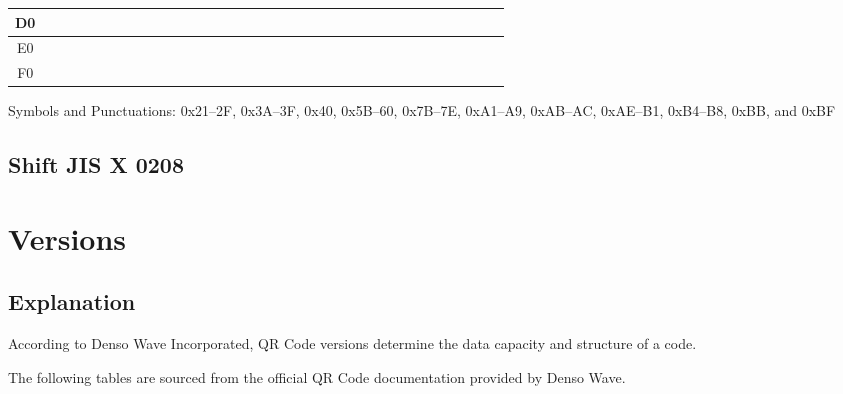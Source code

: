 \documentclass[../../1_thesis]{subfiles}
\begin{document}
\begin{table}[H]
\begin{tabular}{|Sc|Sc|Sc|Sc|Sc|Sc|Sc|Sc|Sc|Sc|Sc|Sc|Sc|Sc|Sc|Sc|Sc|}
D0 &  &  &  &  &
     &  &  &  &  &
     &  &  &  &  &
     &  \\ \hline
E0 &  &  &  &  &
     &  &  &  &  &
     &  &  &  &  &
     &  \\ \hline
F0 &  &  &  &  &
     &  &  &  &  &
     &  &  &  &  &
     &  \\ \hline
\end{tabular}
\end{table}

Symbols and Punctuations: 0x21–2F, 0x3A–3F, 0x40, 0x5B–60, 0x7B–7E, 0xA1–A9, 0xAB–AC, 0xAE–B1, 0xB4–B8, 0xBB, and 0xBF

\subsection{Shift JIS X 0208}
\label{sec:Shift-JIS-X-0208}



\section{Versions}

\subsection{Explanation}

According to Denso Wave Incorporated, QR Code versions determine the data capacity and structure of a code\cite{denso-wave-qr-versions}.

The following tables are sourced from the official QR Code documentation provided by Denso Wave.
\end{document}

